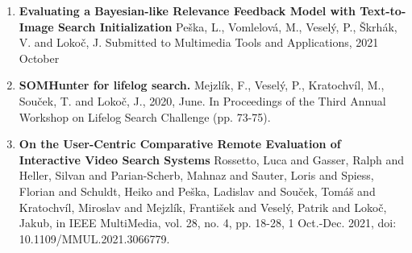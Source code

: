 \begin{enumerate}
	\item \textbf{Evaluating a Bayesian-like Relevance Feedback Model with Text-to-Image Search Initialization} Peška, L., Vomlelová, M., Veselý, P., Škrhák, V. and Lokoč, J. Submitted to Multimedia Tools and Applications, 2021 October
	\item \textbf{SOMHunter for lifelog search.} Mejzlík, F., Veselý, P., Kratochvíl, M., Souček, T. and Lokoč, J., 2020, June. In Proceedings of the Third Annual Workshop on Lifelog Search Challenge (pp. 73-75).
	\item \textbf{On the User-Centric Comparative Remote Evaluation of Interactive Video Search Systems} Rossetto, Luca and Gasser, Ralph and Heller, Silvan and Parian-Scherb, Mahnaz and Sauter, Loris and Spiess, Florian and Schuldt, Heiko and Peška, Ladislav and Souček, Tomáš and Kratochvíl, Miroslav and Mejzlík, František and Veselý, Patrik and Lokoč, Jakub, in IEEE MultiMedia, vol. 28, no. 4, pp. 18-28, 1 Oct.-Dec. 2021, doi: 10.1109/MMUL.2021.3066779.
\end{enumerate}
